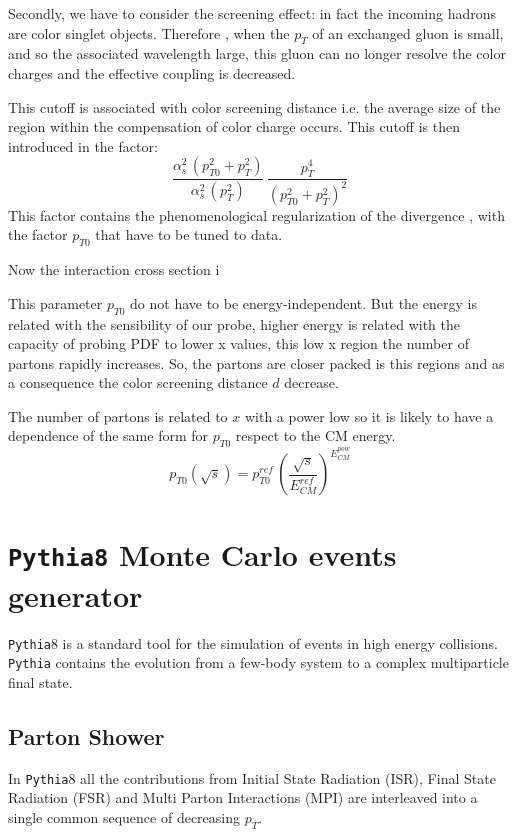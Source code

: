 Secondly, we have to consider the screening effect: in fact the incoming hadrons are color singlet objects. Therefore , when the $p_T$ of an exchanged gluon is small, and so the associated wavelength large, this gluon can no longer resolve the color charges and the effective coupling is decreased.

This cutoff is associated with color screening distance i.e. the average size of the region within the  compensation of color charge occurs.
This cutoff is then introduced in the factor:
\begin{equation}
	\frac{\alpha_s^2\,(p_{T0}^2+p_{T}^2)}{\alpha_s^2\,(p_T^2)}\,\frac{p_T^4}{(p_{T0}^2+p_T^2)^2}
\end{equation}
This factor contains the phenomenological regularization of the divergence , with the factor $p_{T0}$ that have to be tuned to data. 

Now the interaction cross section i

This parameter $p_{T0}$ do not have to be energy-independent. But the energy is related with the sensibility of our probe, higher energy is related with the capacity of probing PDF to lower x values, this low x region the number of partons rapidly increases. So, the partons are closer packed is this regions and as a consequence the color screening distance $d$ decrease.

The number of partons is related to $x$ with a power low so it is likely to have a dependence of the same form for $p_{T0}$ respect to the CM energy.
\begin{equation}
	p_{T0}(\sqrt{s})=p_{T0}^{ref} \,\left( \frac{\sqrt{s}}{E_{CM}^{ref}} \right)^{E_{CM}^{pow}}
\end{equation}
	
\section{\texttt{Pythia8} Monte Carlo events generator}	

\texttt{Pythia}8 is a standard tool for the simulation of events in high energy collisions. \texttt{Pythia} contains the evolution from a few-body system to a complex multiparticle final state.

\subsection{Parton Shower}

 In \texttt{Pythia}8 all the contributions from Initial State Radiation (ISR), Final State Radiation (FSR) and Multi Parton Interactions (MPI) are interleaved into a single common sequence of decreasing $p_T$. 


